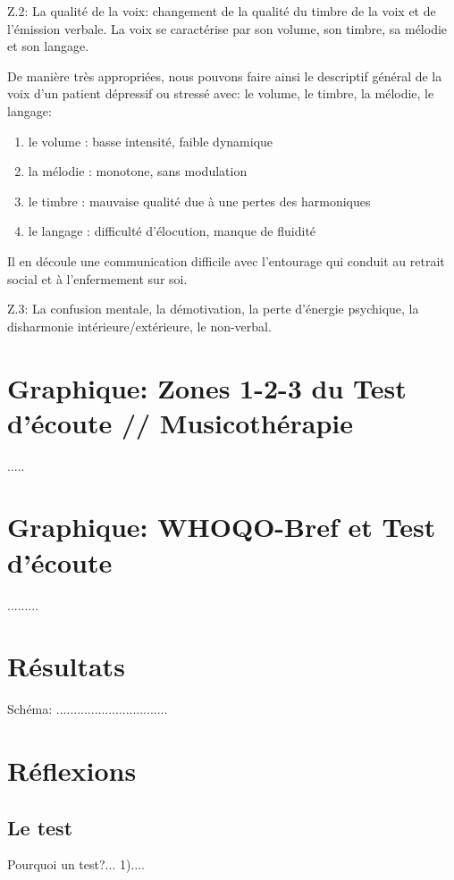  Z.2: La qualité de la voix: changement de la qualité du timbre de la
 voix et de l'émission verbale.
  La voix se caractérise par son volume, son timbre, sa mélodie et son langage. 
 	
 	De manière très appropriées, nous pouvons faire ainsi le
        descriptif général de la voix d'un patient dépressif ou
        stressé avec: le volume, le timbre, la
        mélodie, le langage: 
 	\begin{enumerate}
 		\item le volume : basse intensité, faible dynamique
 		\item la mélodie : monotone, sans modulation
 		\item le timbre : mauvaise qualité due à une pertes des harmoniques
 		\item le langage : difficulté d'élocution, manque de fluidité
 	\end{enumerate}
        Il en découle une communication difficile avec l'entourage qui 
        conduit au retrait social et à l'enfermement sur soi.
        
Z.3: La confusion mentale, la démotivation, la perte d'énergie
psychique, la disharmonie intérieure/extérieure, le non-verbal.


\section{Graphique: Zones 1-2-3 du Test d'écoute // Musicothérapie}

.....



\section{Graphique:  WHOQO-Bref et Test d'écoute}

.........


\section{Résultats}

Schéma: ................................

\section{Réflexions}

\subsection{Le test}
Pourquoi un test?...
1)....







